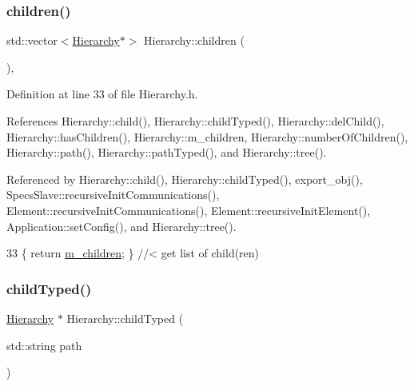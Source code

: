 \subsubsection{\texorpdfstring{children()}{children()}}
{\footnotesize\ttfamily std\+::vector$<$\hyperlink{classHierarchy}{Hierarchy}$\ast$$>$ Hierarchy\+::children (\begin{DoxyParamCaption}{ }\end{DoxyParamCaption})\hspace{0.3cm}{\ttfamily [inline]}, {\ttfamily [inherited]}}



Definition at line 33 of file Hierarchy.\+h.



References Hierarchy\+::child(), Hierarchy\+::child\+Typed(), Hierarchy\+::del\+Child(), Hierarchy\+::has\+Children(), Hierarchy\+::m\+\_\+children, Hierarchy\+::number\+Of\+Children(), Hierarchy\+::path(), Hierarchy\+::path\+Typed(), and Hierarchy\+::tree().



Referenced by Hierarchy\+::child(), Hierarchy\+::child\+Typed(), export\+\_\+obj(), Specs\+Slave\+::recursive\+Init\+Communications(), Element\+::recursive\+Init\+Communications(), Element\+::recursive\+Init\+Element(), Application\+::set\+Config(), and Hierarchy\+::tree().


\begin{DoxyCode}
33 \{ \textcolor{keywordflow}{return} \hyperlink{classHierarchy_a038816763941fd4a930504917f60483b}{m\_children};  \} \textcolor{comment}{//< get list of child(ren)}
\end{DoxyCode}
\mbox{\label{classHierarchy_a0c15a5276a3b80b4354d6bd8a01e0708}} 
\subsubsection{\texorpdfstring{child\+Typed()}{childTyped()}}
{\footnotesize\ttfamily \hyperlink{classHierarchy}{Hierarchy} $\ast$ Hierarchy\+::child\+Typed (\begin{DoxyParamCaption}\item[{std\+::string}]{path }\end{DoxyParamCaption})\hspace{0.3cm}{\ttfamily [inherited]}}



